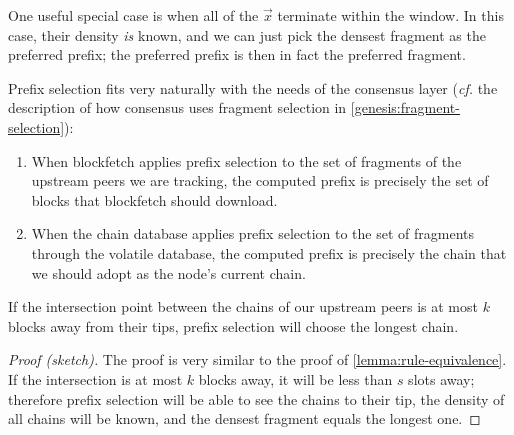 \begin{definition}
\begin{enumerate}
\begin{center}
\end{center}
%
One useful special case is when all of the $\vec{x}$ terminate within the
window. In this case, their density \emph{is} known, and we can just pick the
densest fragment as the preferred prefix; the preferred prefix is then in fact
the preferred fragment.
\end{enumerate}
\end{definition}

Prefix selection fits very naturally with the needs of the consensus layer
(\emph{cf.} the description of how consensus uses fragment selection in
\cref{genesis:fragment-selection}):
%
\begin{enumerate}
\item When blockfetch applies prefix selection to the set of fragments of
the upstream peers we are tracking, the computed prefix is precisely the set
of blocks that blockfetch should download.
\item When the chain database applies prefix selection to the set of fragments
through the volatile database, the computed prefix is precisely the chain that
we should adopt as the node's current chain.
\end{enumerate}

\begin{lemma}
If the intersection point between the chains of our upstream peers is at most
$k$ blocks away from their tips, prefix selection will choose the longest chain.
\end{lemma}

\begin{proof}[Proof (sketch)]
The proof is very similar to the proof of \cref{lemma:rule-equivalence}.
If the intersection is at most $k$ blocks away, it will be less than $s$ slots
away; therefore prefix selection will be able to see the chains to their tip,
the density of all chains will be known, and the densest fragment equals the
longest one.
\end{proof}

